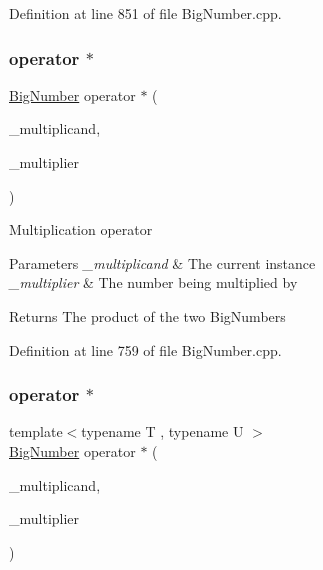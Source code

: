 Definition at line 851 of file Big\+Number.\+cpp.

\mbox{\label{class_big_nums_1_1_big_number_a390a7b0928f684129947af34272b1def}} 
\subsubsection{\texorpdfstring{operator $\ast$}{operator *}\hspace{0.1cm}{\footnotesize\ttfamily [1/2]}}
{\footnotesize\ttfamily \mbox{\hyperlink{class_big_nums_1_1_big_number}{Big\+Number}} operator $\ast$ (\begin{DoxyParamCaption}\item[{\mbox{\hyperlink{class_big_nums_1_1_big_number}{Big\+Number}}}]{\+\_\+multiplicand,  }\item[{const \mbox{\hyperlink{class_big_nums_1_1_big_number}{Big\+Number}} \&}]{\+\_\+multiplier }\end{DoxyParamCaption})\hspace{0.3cm}{\ttfamily [friend]}}

Multiplication operator 
\begin{DoxyParams}{Parameters}
{\em \+\_\+multiplicand} & The current instance \\
\hline
{\em \+\_\+multiplier} & The number being multiplied by \\
\hline
\end{DoxyParams}
\begin{DoxyReturn}{Returns}
The product of the two Big\+Numbers 
\end{DoxyReturn}


Definition at line 759 of file Big\+Number.\+cpp.

\mbox{\label{class_big_nums_1_1_big_number_ad33abbbc2055753a8b76762a6d5ef947}} 
\subsubsection{\texorpdfstring{operator $\ast$}{operator *}\hspace{0.1cm}{\footnotesize\ttfamily [2/2]}}
{\footnotesize\ttfamily template$<$typename T , typename U $>$ \\
\mbox{\hyperlink{class_big_nums_1_1_big_number}{Big\+Number}} operator $\ast$ (\begin{DoxyParamCaption}\item[{const T \&}]{\+\_\+multiplicand,  }\item[{const U \&}]{\+\_\+multiplier }\end{DoxyParamCaption})\hspace{0.3cm}{\ttfamily [friend]}}



